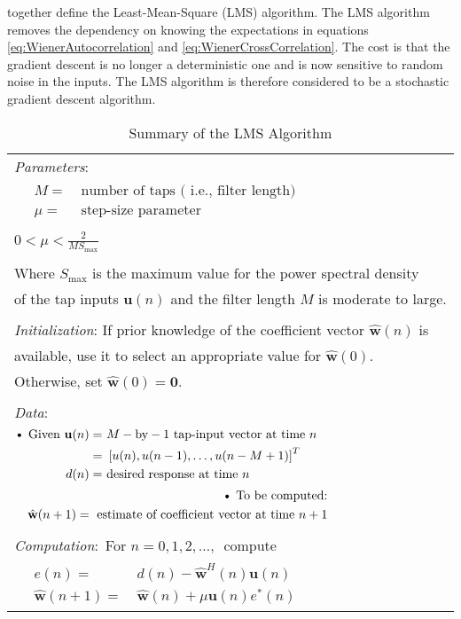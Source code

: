 together define the Least-Mean-Square (LMS) algorithm. %
The LMS algorithm removes the dependency on knowing the %
expectations in equations \ref{eq:WienerAutocorrelation} %
and \ref{eq:WienerCrossCorrelation}. The cost is that %
the gradient descent is no longer a deterministic one %
and is now sensitive to random noise in the inputs. The LMS %
algorithm is therefore considered to be a stochastic gradient %
descent algorithm.
\begin{table}[ht]
	\centering
	\begin{tabular}{l}
		\hline
		\emph{Parameters}: \\
		$\begin{aligned}
			\quad M =&~\text{number of taps (
			i.e., filter length)}\\
			\quad \mu =&~\text{step-size 
			parameter}
		\end{aligned}$\\
		\\
		$0 < \mu < \frac{2}{MS_{\text{max}}}$\\
		\\
		Where $S_{\text{max}}$ is the maximum
		value for the power spectral density\\
		of the tap inputs $\mathbf{u}(n)$ and the filter
		length $M$ is moderate to large.\\
		\\
		\emph{Initialization}: If prior
		knowledge of the coefficient vector 
		$\hat{\mathbf{w}}(n)$ is \\available, use 
		it to select an appropriate value for 
		$\hat{\mathbf{w}}(0)$. \\Otherwise, set 
		$\hat{\mathbf{w}}(0) = \mathbf{0}$.\\
		\\
		\emph{Data}: \\
		$\begin{aligned}
			\text{\textbullet}~
			\text{Given } \mathbf{u}(n) =&~
			M-\text{by}-1~\text{tap-input 
			vector at time }n\\
			=&~\left[u(n),u(n-1),\ldots,
			u(n-M+1)\right]^{T}\\
			d(n) =&~\text{desired response
			at time }n
		\end{aligned}$\\
		$\begin{aligned}
			\text{\textbullet}~
			\text{To be computed:}\\
			\quad\hat{\mathbf{w}}(n+1)=~
			\text{estimate of coefficient vector
			at time }n+1
		\end{aligned}$\\
		\\
		\emph{Computation}:~For $n=0,1,2,\ldots,$~compute\\
		$\begin{aligned}
			\quad e(n)=&~d(n) - \hat{\mathbf{w}}^{H}(n)
			\mathbf{u}(n)\\
			\quad \hat{\mathbf{w}}(n+1) =&~ 
			\hat{\mathbf{w}}(n) + \mu\mathbf{u}(n)e
			^{*}(n)
		\end{aligned}$\\
		\hline
	\end{tabular}
	\caption{Summary of the LMS Algorithm \cite{Hay02}}
	\label{tab:LMS}
\end{table}
\FloatBarrier
